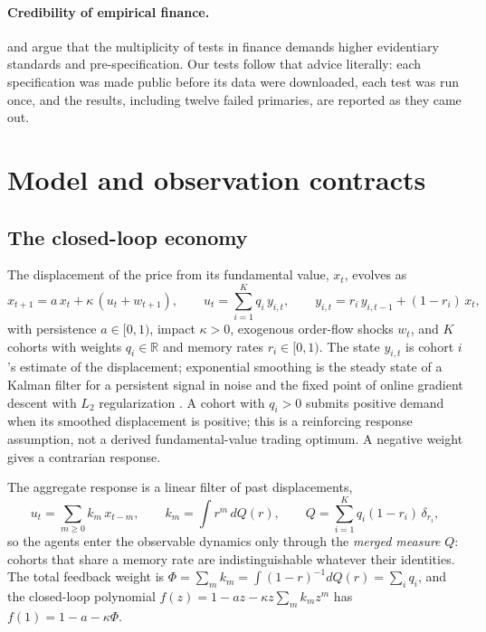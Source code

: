 \documentclass[12pt]{article}
\theoremstyle{definition}
\theoremstyle{remark}
\newcommand{\R}{\mathbb{R}}
\begin{document}
\paragraph{Credibility of empirical finance.} \citet{harvey2016} and \citet{harvey2017} argue that the multiplicity of tests in finance demands higher evidentiary standards and pre-specification. Our tests follow that advice literally: each specification was made public before its data were downloaded, each test was run once, and the results, including twelve failed primaries, are reported as they came out.

\section{Model and observation contracts}\label{sec:model}

\subsection{The closed-loop economy}

The displacement of the price from its fundamental value, $x_t$, evolves as
\begin{equation}\label{eq:plant}
x_{t+1}=a\,x_t+\kappa\,(u_t+w_{t+1}),\qquad u_t=\sum_{i=1}^Kq_i\,y_{i,t},\qquad y_{i,t}=r_i\,y_{i,t-1}+(1-r_i)\,x_t,
\end{equation}
with persistence $a\in[0,1)$, impact $\kappa>0$, exogenous order-flow shocks $w_t$, and $K$ cohorts with weights $q_i\in\R$ and memory rates $r_i\in[0,1)$. The state $y_{i,t}$ is cohort $i$'s estimate of the displacement; exponential smoothing is the steady state of a Kalman filter for a persistent signal in noise and the fixed point of online gradient descent with $L_2$ regularization \citep{niroula2026a}. A cohort with $q_i>0$ submits positive demand when its smoothed displacement is positive; this is a reinforcing response assumption, not a derived fundamental-value trading optimum. A negative weight gives a contrarian response.

The aggregate response is a linear filter of past displacements,
\[
u_t=\sum_{m\ge0}k_m\,x_{t-m},\qquad k_m=\int r^m\,dQ(r),\qquad Q=\sum_{i=1}^Kq_i(1-r_i)\,\delta_{r_i},
\]
so the agents enter the observable dynamics only through the \emph{merged measure} $Q$: cohorts that share a memory rate are indistinguishable whatever their identities. The total feedback weight is $\Phi=\sum_mk_m=\int(1-r)^{-1}dQ(r)=\sum_iq_i$, and the closed-loop polynomial $f(z)=1-az-\kappa z\sum_mk_mz^m$ has $f(1)=1-a-\kappa\Phi$.
\end{document}

